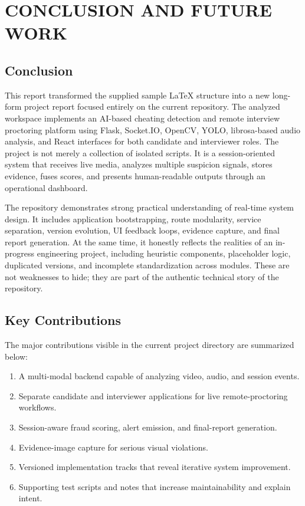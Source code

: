\documentclass[12pt,a4paper]{extreport}
\begin{document}
\chapter{CONCLUSION AND FUTURE WORK}
\section{Conclusion}
This report transformed the supplied sample \LaTeX{} structure into a new long-form project report focused entirely on the current repository. The analyzed workspace implements an AI-based cheating detection and remote interview proctoring platform using Flask, Socket.IO, OpenCV, YOLO, librosa-based audio analysis, and React interfaces for both candidate and interviewer roles. The project is not merely a collection of isolated scripts. It is a session-oriented system that receives live media, analyzes multiple suspicion signals, stores evidence, fuses scores, and presents human-readable outputs through an operational dashboard.

The repository demonstrates strong practical understanding of real-time system design. It includes application bootstrapping, route modularity, service separation, version evolution, UI feedback loops, evidence capture, and final report generation. At the same time, it honestly reflects the realities of an in-progress engineering project, including heuristic components, placeholder logic, duplicated versions, and incomplete standardization across modules. These are not weaknesses to hide; they are part of the authentic technical story of the repository.

\section{Key Contributions}
The major contributions visible in the current project directory are summarized below:
\begin{enumerate}
  \item A multi-modal backend capable of analyzing video, audio, and session events.
  \item Separate candidate and interviewer applications for live remote-proctoring workflows.
  \item Session-aware fraud scoring, alert emission, and final-report generation.
  \item Evidence-image capture for serious visual violations.
  \item Versioned implementation tracks that reveal iterative system improvement.
  \item Supporting test scripts and notes that increase maintainability and explain intent.
\end{enumerate}
\end{document}
